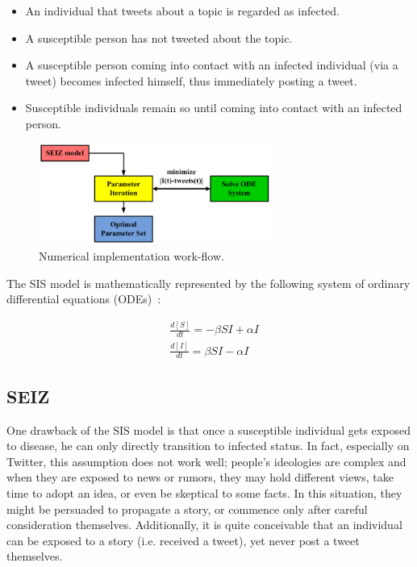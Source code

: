 \begin{itemize}
\item An individual that tweets about a topic is regarded as infected.
\item A susceptible person has not tweeted about the topic.
\item A susceptible person coming into contact with an infected individual (via a tweet) becomes infected himself, thus immediately posting a tweet.
\item Susceptible individuals remain so until coming into contact with an infected person.
\end{itemize}

\begin{figure}[t]
\centering
  \includegraphics[width=3in]{pictures/implementation_flow.png}
  \vspace{-1em}
  \caption{Numerical implementation work-flow.
  }
  \label{fig:implementation_flow}
\end{figure}

\noindent
The SIS model is mathematically represented by the following system of ordinary differential equations (ODEs)~\cite{murray2002mathematical}:

\begin{subequations}\label{eq:sis}
\begin{align}
&\frac{d [S]}{dt} = -\beta S I + \alpha I \\
&\frac{d [I]}{dt} = \beta S I - \alpha I
\end{align}
\end{subequations}


\subsection{SEIZ}
One drawback of the SIS model is that once a susceptible individual gets exposed to disease, he can only directly transition to infected status. In fact, especially on Twitter, this assumption does not work well; people's ideologies are complex and when they are exposed to news or rumors, they may hold different views, take time to adopt an idea, or even be skeptical to some facts. In this situation, they might be persuaded to propagate a story, or commence only after careful consideration themselves. Additionally, it is quite conceivable that an individual can be exposed to a story (i.e. received a tweet), yet never post a tweet themselves.

